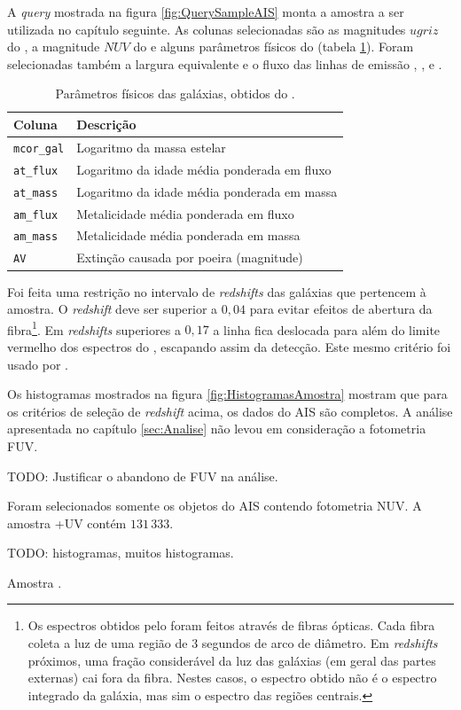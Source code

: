 A {\em query} mostrada na figura \ref{fig:QuerySampleAIS} monta a amostra a ser
utilizada no capítulo seguinte. As colunas selecionadas são as magnitudes
$ugriz$ do \SDSS, a magnitude $NUV$ do \galex e alguns parâmetros físicos do
\starlight (tabela \ref{tab:ParamFisicos}). Foram selecionadas também a largura
equivalente e o fluxo das linhas de emissão \Halpha, \Hbeta, \OIII e \NII.

\begin{table}
	\caption[Parâmetros físicos das galáxias utilizados na amostra.]
	{Parâmetros físicos das galáxias, obtidos do \starlight.}
	\begin{tabular}{l l}
		Coluna & Descrição \\
		\midrule
		\texttt{mcor\_gal} & Logaritmo da massa estelar \\
		\texttt{at\_flux}  & Logaritmo da idade média ponderada em fluxo \\
		\texttt{at\_mass}  & Logaritmo da idade média ponderada em massa \\
		\texttt{am\_flux}  & Metalicidade média ponderada em fluxo \\
		\texttt{am\_mass}  & Metalicidade média ponderada em massa \\
		\texttt{AV}        & Extinção causada por poeira (magnitude) \\
	\end{tabular}
	\label{tab:ParamFisicos}
\end{table}

Foi feita uma restrição no intervalo de {\em redshifts} das galáxias que
pertencem à amostra. O {\em redshift} deve ser superior a $0,04$ para evitar
efeitos de abertura da fibra\footnote{Os espectros obtidos pelo \SDSS foram
feitos através de fibras ópticas. Cada fibra coleta a luz de uma região de 3
segundos de arco de diâmetro. Em {\em redshifts} próximos, uma fração
considerável da luz das galáxias (em geral das partes externas) cai fora da
fibra. Nestes casos, o espectro obtido não é o espectro integrado da galáxia,
mas sim o espectro das regiões centrais.}. Em {\em redshifts} superiores a
$0,17$ a linha \NII fica deslocada para além do limite vermelho dos espectros do
\SDSS, escapando assim da detecção. Este mesmo critério foi usado por
\citet{CidFernandes2011}.

Os histogramas mostrados na figura \ref{fig:HistogramasAmostra} mostram que para
os critérios de seleção de {\em redshift} acima, os dados do AIS são completos.
A análise apresentada no capítulo \ref{sec:Analise} não levou em consideração a
fotometria FUV.

TODO: Justificar o abandono de FUV na análise.

Foram selecionados somente os objetos do AIS contendo
fotometria NUV. A amostra \starlight+UV contém $131\,333$.

TODO: histogramas, muitos histogramas.

Amostra \starlightUV.


